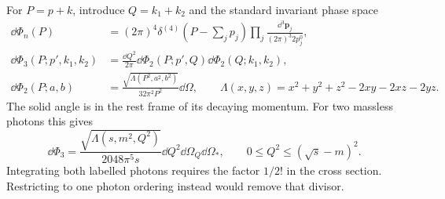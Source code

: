 For $P=p+k$, introduce $Q=k_1+k_2$ and the standard invariant
phase space
\begin{align}
 \dd\Phi_n(P)&=(2\pi)^4\delta^{(4)}(P-\textstyle\sum_j p_j)
             \prod_j\frac{\dd^3\bm p_j}{(2\pi)^3 2p_j^0},\\
 \dd\Phi_3(P;p',k_1,k_2)&=\frac{\dd Q^2}{2\pi}
       \dd\Phi_2(P;p',Q)\dd\Phi_2(Q;k_1,k_2),\\
 \dd\Phi_2(P;a,b)&=\frac{\sqrt{\Lambda(P^2,a^2,b^2)}}
                          {32\pi^2P^2}\dd\Omega,
 \qquad\Lambda(x,y,z)=x^2+y^2+z^2-2xy-2xz-2yz.
\end{align}
The solid angle is in the rest frame of its decaying momentum.
For two massless photons this gives
\begin{equation}
 \dd\Phi_3=\frac{\sqrt{\Lambda(s,m^2,Q^2)}}{2048\pi^5s}
             \dd Q^2\dd\Omega_Q\dd\Omega_*,\qquad
 0\leq Q^2\leq(\sqrt s-m)^2.
\end{equation}
Integrating both labelled photons requires the factor $1/2!$ in
the cross section. Restricting to one photon ordering instead would
remove that divisor.

